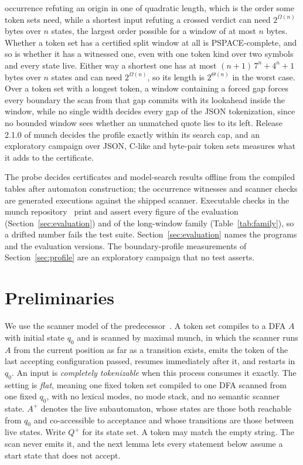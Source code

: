 \documentclass[11pt,a4paper]{article}
\theoremstyle{definition}
\theoremstyle{plain}
\begin{document}
\begin{itemize}
occurrence refuting an origin in one of quadratic length, which is the order some token sets need, while a shortest
input refuting a crossed verdict can need $2^{\Omega(n)}$ bytes over $n$ states, the largest order possible for a window
of at most $n$ bytes. Whether a token set has a certified split window at all is PSPACE-complete, and so is whether it
has a witnessed one, even with one token kind over two symbols and every state live. Either way a shortest one has at
most $(n + 1)\, 7^n + 4^n + 1$ bytes over $n$ states and can need $2^{\Omega(n)}$, so its length is $2^{\Theta(n)}$ in
the worst case. Over a token set with a longest token, a window containing a forced gap forces every boundary the scan
from that gap commits with its lookahead inside the window, while no single width decides every gap of the JSON
tokenization, since no bounded window sees whether an unmatched quote lies to its left. Release 2.1.0 of munch decides
the profile exactly within its search cap, and an exploratory campaign over JSON, C-like and byte-pair token sets
measures what it adds to the certificate.
\end{itemize}

The probe decides certificates and model-search results offline from the compiled tables after automaton construction;
the occurrence witnesses and scanner checks are generated executions against the shipped scanner. Executable checks in
the munch repository~\cite{munch} print and assert every figure of the evaluation (Section~\ref{sec:evaluation}) and of
the long-window family (Table~\ref{tab:family}), so a drifted number fails the test suite. Section~\ref{sec:evaluation}
names the programs and the evaluation versions. The boundary-profile measurements of Section~\ref{sec:profile} are an
exploratory campaign that no test asserts.

\section{Preliminaries}
\label{sec:preliminaries}

We use the scanner model of the predecessor~\cite{nidhogg2026splitpoints}. A token set compiles to a DFA $A$ with
initial state $q_0$ and is scanned by maximal munch, in which the scanner runs $A$ from the current position as far as a
transition exists, emits the token of the last accepting configuration passed, resumes immediately after it, and
restarts in $q_0$. An input is \emph{completely tokenizable} when this process consumes it exactly. The setting is
\emph{flat}, meaning one fixed token set compiled to one DFA scanned from one fixed $q_0$, with no lexical modes, no
mode stack, and no semantic scanner state. $A^+$ denotes the live subautomaton, whose states are those both reachable
from $q_0$ and co-accessible to acceptance and whose transitions are those between live states. Write $Q^+$ for its
state set. A token may match the empty string. The scan never emits it, and the next lemma lets every statement below
assume a start state that does not accept.
\end{document}
